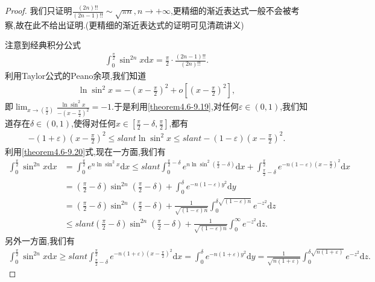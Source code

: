 \documentclass[../../main.tex]{subfiles}
\begin{document}
\begin{proof}
我们只证明$\frac{(2n)!!}{(2n-1)!!}\sim \sqrt{\pi n},n\rightarrow +\infty$,更精细的渐近表达式一般不会被考察,故在此不给出证明.(更精细的渐近表达式的证明可见清疏讲义)

注意到经典积分公式
\begin{align}\label{theorem4.6-1.1}
\int_{0}^{\frac{\pi}{2}}\sin^{2n}x \mathrm{d}x=\frac{\pi}{2}\cdot\frac{(2n - 1)!!}{(2n)!!}.
\end{align}
利用Taylor公式的Peano余项,我们知道
\begin{align}\label{theorem4.6-9.19}
\ln\sin^{2}x=-\left(x - \frac{\pi}{2}\right)^{2}+o\left[\left(x - \frac{\pi}{2}\right)^{2}\right],
\end{align}
即\(\lim_{x\rightarrow(\frac{\pi}{2})}\frac{\ln\sin^{2}x}{-(x - \frac{\pi}{2})^{2}}=-1\).于是利用\eqref{theorem4.6-9.19},对任何\(\varepsilon\in(0,1)\),我们知道存在\(\delta\in(0,1)\),使得对任何\(x\in[\frac{\pi}{2}-\delta,\frac{\pi}{2}]\),都有
\begin{align}\label{theorem4.6-9.20}
-(1 + \varepsilon)\left(x - \frac{\pi}{2}\right)^{2}\leqslant slant\ln\sin^{2}x\leqslant slant-(1 - \varepsilon)\left(x - \frac{\pi}{2}\right)^{2}.
\end{align}
利用\eqref{theorem4.6-9.20}式,现在一方面,我们有
\begin{align*}
\int_{0}^{\frac{\pi}{2}}\sin^{2n}x \mathrm{d}x&=\int_{0}^{\frac{\pi}{2}}e^{n\ln\sin^{2}x}\mathrm{d}x
\leqslant slant\int_{0}^{\frac{\pi}{2}-\delta}e^{n\ln\sin^{2}(\frac{\pi}{2}-\delta)}\mathrm{d}x+\int_{\frac{\pi}{2}-\delta}^{\frac{\pi}{2}}e^{-n(1 - \varepsilon)(x - \frac{\pi}{2})^{2}}\mathrm{d}x\\
&=(\frac{\pi}{2}-\delta)\sin^{2n}(\frac{\pi}{2}-\delta)+\int_{0}^{\delta}e^{-n(1 - \varepsilon)y^{2}}\mathrm{d}y\\
&=(\frac{\pi}{2}-\delta)\sin^{2n}(\frac{\pi}{2}-\delta)+\frac{1}{\sqrt{(1 - \varepsilon)n}}\int_{0}^{\delta\sqrt{(1 - \varepsilon)n}}e^{-z^{2}}\mathrm{d}z\\
&\leqslant slant(\frac{\pi}{2}-\delta)\sin^{2n}(\frac{\pi}{2}-\delta)+\frac{1}{\sqrt{(1 - \varepsilon)n}}\int_{0}^{\infty}e^{-z^{2}}\mathrm{d}z.
\end{align*}
另外一方面,我们有
\begin{align*}
\int_{0}^{\frac{\pi}{2}}\sin^{2n}x \mathrm{d}x\geqslant slant\int_{\frac{\pi}{2}-\delta}^{\frac{\pi}{2}}e^{-n(1 + \varepsilon)(x - \frac{\pi}{2})^{2}}\mathrm{d}x
=\int_{0}^{\delta}e^{-n(1 + \varepsilon)y^{2}}\mathrm{d}y
=\frac{1}{\sqrt{n(1 + \varepsilon)}}\int_{0}^{\delta\sqrt{n(1 + \varepsilon)}}e^{-z^{2}}\mathrm{d}z.

\end{align*}
\end{proof}
\end{document}
